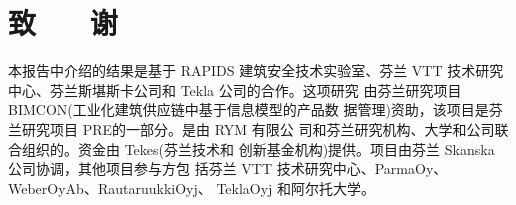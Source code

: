 \section*{致 ~~ 谢}
本报告中介绍的结果是基于 RAPIDS 建筑安全技术实验室、芬兰
VTT 技术研究中心、芬兰斯堪斯卡公司和 Tekla 公司的合作。这项研究
由芬兰研究项目 BIMCON(工业化建筑供应链中基于信息模型的产品数
据管理)资助，该项目是芬兰研究项目 PRE的一部分。是由 RYM 有限公
司和芬兰研究机构、大学和公司联合组织的。资金由 Tekes(芬兰技术和
创新基金机构)提供。项目由芬兰 Skanska 公司协调，其他项目参与方包
括芬兰 VTT 技术研究中心、ParmaOy、WeberOyAb、RautaruukkiOyj、
TeklaOyj 和阿尔托大学。